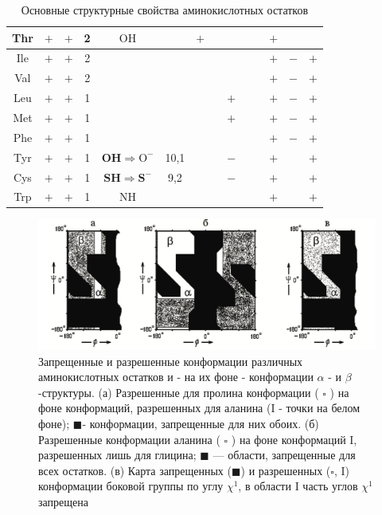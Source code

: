 \documentclass[
11pt,%
tightenlines,%
twoside,%
onecolumn,%
nofloats,%
nobibnotes,%
nofootinbib,%
superscriptaddress,%
noshowpacs,%
centertags]%
{revtex4}
\begin{document}
\begin{table}[!ht]
\begin{tabular}{|c|c|c|c|c|c|c|c|c|c|c|c|c|c|}
		\hline Thr & $+$ & $+$ & 2 & $\mathrm{OH}$ & & $+$ & & & & & \boldmath$+$ & & \\
		\hline Ile & $+$ & $+$ & 2 & & & & & & & & \boldmath$+$ & $-$ & \boldmath$+$ \\
		\hline Val & $+$ & $+$ & 2 & & & & & & & & \boldmath$+$ & $-$ & \boldmath$+$ \\
		\hline Leu & $+$ & $+$ & 1 & & & & & \boldmath$+$ & & & $+$ & \boldmath$-$ & \boldmath$+$ \\
		\hline Met & $+$ & $+$ & 1 & & & & & \boldmath$+$ & & & \boldmath$+$ & \boldmath$-$ & \boldmath$+$ \\
		\hline Phe & $+$ & $+$ & 1 & & & & & & & & $+$ & $-$ & \boldmath$+$ \\
		\hline Tyr &$+$ & $+$ & 1 & $\mathbf{O H} \Rightarrow \mathrm{O}^{-}$ & 10,1 & & &$-$ & & & $+$ & & $+$ \\
		\hline Cys & $+$ & $+$ & 1 & $\mathbf{S H} \Rightarrow \mathbf{S}^{-}$ & 9,2 & & & $-$ & & & $+$ & & \boldmath$+$ \\
		\hline Trp & $+$ & $+$ & 1 & $\mathrm{NH}$ & & & & & & & $+$ & & $+$ \\
		\hline
	\end{tabular}
	\caption{Основные структурные свойства аминокислотных остатков}
	\label{tbl:table}
\end{table}
\begin{figure}[!ht]
	\centering
	\includegraphics[width=\textwidth]{zone}
	\caption{Запрещенные и разрешенные конформации различных аминокислотных остатков и - на их фоне - конформации $\alpha$ - и $\beta$-структуры. (а) Разрешенные для пролина конформации ( $\square$ ) на фоне конформаций, разрешенных для аланина (I - точки на белом фоне); $\blacksquare$- конформации, запрещенные для них обоих. (б) Разрешенные конформации аланина ( $\square$ ) на фоне конформаций I, разрешенных лишь для глицина; $\blacksquare$ — области, запрещенные для всех остатков. (в) Карта запрещенных ($\blacksquare$) и разрешенных ($\square$, I) конформации боковой группы по углу $\chi^1$, в области I часть углов $\chi^1$ запрещена}
\end{figure}
\end{document}
